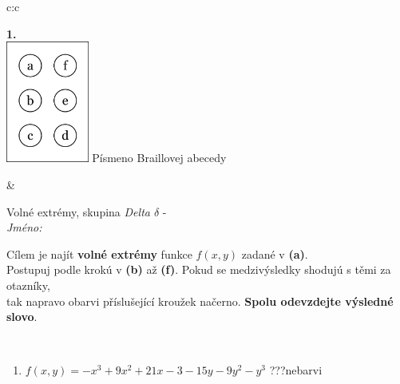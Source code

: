 \documentclass[10pt]{report}
\begin{document}
\begin{tabular}{c:c}
\begin{minipage}[c][104.5mm][t]{0.5\linewidth}
\begin{center}
\begin{minipage}{0.79\linewidth}
\begin{center}
\begin{varwidth}{\linewidth}
\begin{enumerate}
\end{enumerate}
\end{varwidth}
\end{center}
\end{minipage}
\begin{minipage}{0.20\linewidth}
\begin{center}
{\Huge\bfseries 1.} \\[2mm]
\includegraphics[height=40mm]{../images/braille.png}
{\small Písmeno Braillovej abecedy}
\end{center}
\end{minipage}
\end{center}
\end{minipage}
&
\begin{minipage}[c][104.5mm][t]{0.5\linewidth}
\begin{center}
\vspace{7mm}
{\huge Volné extrémy, skupina \textit{Delta $\delta$} -}\\[5mm]
\textit{Jméno:}\phantom{xxxxxxxxxxxxxxxxxxxxxxxxxxxxxxxxxxxxxxxxxxxxxxxxxxxxxxxxxxxxxxxxx}\\[5mm]
\begin{minipage}{0.95\linewidth}
\begin{center}
Cílem je najít \textbf{volné extrémy} funkce $f(x,y)$ zadané v \textbf{(a)}.\\Postupuj podle krokú v \textbf{(b)} až \textbf{(f)}. Pokud se medzivýsledky shodujú s těmi za otazníky,\\tak napravo obarvi příslušející kroužek načerno. \textbf{Spolu odevzdejte výsledné slovo}.
\end{center}
\end{minipage}
\\[1mm]
\begin{minipage}{0.79\linewidth}
\begin{center}
\begin{varwidth}{\linewidth}
\begin{enumerate}
\normalsize
\item $f(x,y)=-x^3+9x^2+21x-3-15y-9y^2-y^3$\quad \dotfill\; ???\;\dotfill \quad nebarvi

\end{enumerate}
\end{varwidth}
\end{center}
\end{minipage}
\end{center}
\end{minipage}
\end{tabular}
\end{document}

